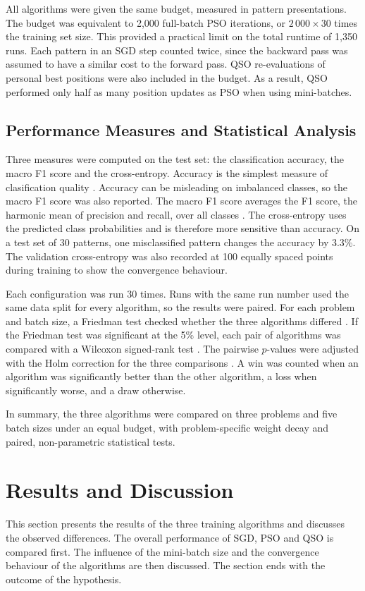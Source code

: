 \documentclass[conference]{IEEEtran}
\begin{document}
All algorithms were given the same budget, measured in pattern presentations. 
The budget was equivalent to 2,000 full-batch PSO iterations, or 
$2\,000 \times 30$ times the training set size. This provided a practical 
limit on the total runtime of 1,350 runs. Each pattern in an SGD step counted 
twice, since the backward pass was assumed to have a similar cost to the 
forward pass. QSO re-evaluations of personal best positions were also 
included in the budget. As a result, QSO performed only half as many 
position updates as PSO when using mini-batches.

\subsection{Performance Measures and Statistical Analysis}
Three measures were computed on the test set: the classification
accuracy, the macro F1 score and the cross-entropy. Accuracy is the
simplest measure of clasification quality
\cite{kelleher2015}. Accuracy can be misleading on
imbalanced classes, so the macro F1 score was also reported. The macro
F1 score averages the F1 score, the harmonic mean of precision and
recall, over all classes \cite{kelleher2015}. The
cross-entropy uses the predicted class probabilities and is therefore
more sensitive than accuracy. On a test set of 30 patterns, one
misclassified pattern changes the accuracy by 3.3\%. The validation
cross-entropy was also recorded at 100 equally spaced points during
training to show the convergence behaviour.

Each configuration was run 30 times. Runs with the same run number
used the same data split for every algorithm, so the results were
paired.
For each problem and batch size, a Friedman test checked whether the
three algorithms differed \cite{friedman1940}. If the Friedman test
was significant at the 5\% level, each pair of algorithms was compared
with a Wilcoxon signed-rank test \cite{wilcoxon1945}. The pairwise
$p$-values were adjusted with the Holm correction for the three
comparisons \cite{holm1979}. A win was counted when an algorithm was
significantly better than the other algorithm, a loss when
significantly worse, and a draw otherwise.

In summary, the three algorithms were compared on three problems and
five batch sizes under an equal budget, with problem-specific weight
decay and paired, non-parametric statistical tests.

\section{Results and Discussion}
\label{sec:results}
This section presents the results of the three training algorithms
and discusses the observed differences. The overall performance of
SGD, PSO and QSO is compared first. The influence of the mini-batch
size and the convergence behaviour of the algorithms are then
discussed. The section ends with the outcome of the hypothesis.
\end{document}
